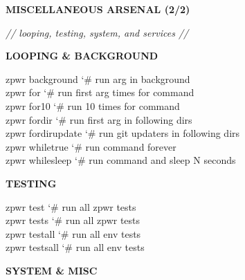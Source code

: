 \documentclass[11pt,a4paper,twoside]{book}
\begin{document}
\vspace{10pt}
{\large\bfseries\color{neoncyan} MISCELLANEOUS ARSENAL (2/2)}\vspace{6pt}

{\small\itshape\color{dimtext} // looping, testing, system, and services //}


\vspace{12pt}
{\bfseries\color{neonyellow} LOOPING \& BACKGROUND}\vspace{4pt}

\begin{codebox}
\color{neongreen}zpwr background            {\char`\#} run arg in background\\
\color{neongreen}zpwr for                   {\char`\#} run first arg times for command\\
\color{neongreen}zpwr for10                 {\char`\#} run 10 times for command\\
\color{neongreen}zpwr fordir                {\char`\#} run first arg in following dirs\\
\color{neongreen}zpwr fordirupdate          {\char`\#} run git updaters in following dirs\\
\color{neongreen}zpwr whiletrue             {\char`\#} run command forever\\
\color{neongreen}zpwr whilesleep            {\char`\#} run command and sleep N seconds\\
\end{codebox}


\vspace{12pt}
{\bfseries\color{neonyellow} TESTING}\vspace{4pt}

\begin{codebox}
\color{neongreen}zpwr test                  {\char`\#} run all zpwr tests\\
\color{neongreen}zpwr tests                 {\char`\#} run all zpwr tests\\
\color{neongreen}zpwr testall               {\char`\#} run all env tests\\
\color{neongreen}zpwr testsall              {\char`\#} run all env tests\\
\end{codebox}


\vspace{12pt}
{\bfseries\color{neonyellow} SYSTEM \& MISC}\vspace{4pt}
\end{document}
